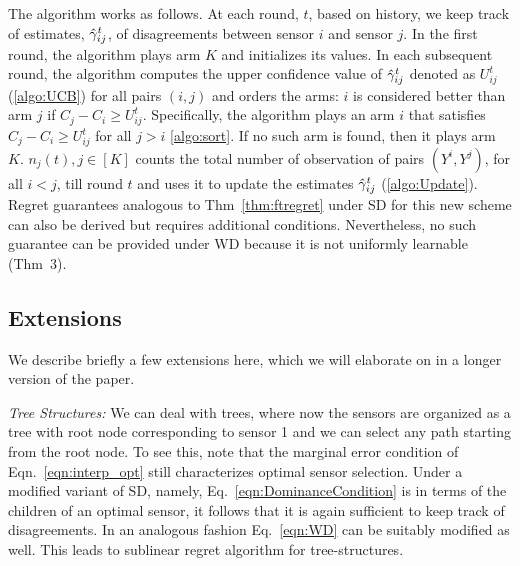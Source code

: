 \documentclass[11pt]{article} %
\newcommand{\ses}{sensor selection\xspace}
\begin{document}
The algorithm works as follows. At each round, $t$, based on history, we keep track of estimates, $\hat{\gamma}^t_{ij}$, of disagreements between sensor $i$ and sensor $j$.  %
In the first round, the algorithm plays arm $K$ and initializes its values. In each subsequent round, the algorithm computes the upper confidence value of $\hat{\gamma}^t_{ij}$ denoted as $U^t_{ij}$ (\ref{algo:UCB}) for all pairs $(i,j)$ and orders the arms: $i$ is considered better than arm $j$ if $C_j-C_i \geq U^t_{ij}$. Specifically, the algorithm plays an arm $i$ that satisfies $C_j-C_i \geq U^t_{ij}$ for all $j>i$ \ref{algo:sort}. If no such arm is found, then it plays arm $K$.  $n_j(t), j\in [K] $ counts the total number of observation of pairs $(Y^i, Y^j)$, for all $i<j$, till round $t$ and uses it to update the estimates $\hat{\gamma}_{ij}^t$ (\ref{algo:Update}). Regret guarantees analogous to Thm~\ref{thm:ftregret} under SD for this new scheme can also be derived but requires additional conditions. Nevertheless, no such guarantee can be provided under WD because it is not uniformly learnable (Thm~3). %
\subsection{Extensions} 
We describe briefly a few extensions here, which we will elaborate on in a longer version of the paper.

\noindent
{\it Tree Structures:}
We can deal with trees, where now the sensors are organized as a tree with root node corresponding to sensor 1 and we can select any path starting from the root node. To see this, note that the marginal error condition of Eqn.~\ref{eqn:interp_opt} still characterizes optimal \ses. Under a modified variant of SD, namely, Eq.~\ref{eqn:DominanceCondition} is in terms of the children of an optimal sensor, it follows that it is again sufficient to keep track of disagreements. In an analogous fashion Eq.~\ref{eqn:WD} can be suitably modified as well. This leads to sublinear regret algorithm for tree-structures. %
\end{document}
